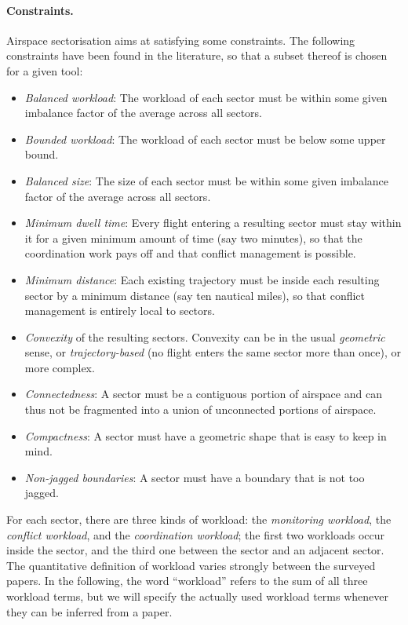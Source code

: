 \documentclass[a4paper,12pt]{article}
\begin{document}
\paragraph{Constraints.}
Airspace sectorisation aims at satisfying some constraints.  The
following constraints have been found in the literature, so that a
subset thereof is chosen for a given tool:
\begin{itemize}
\item \emph{Balanced workload}: The workload of each sector must be
  within some given imbalance factor of the average across all
  sectors.
\item \emph{Bounded workload}: The workload of each sector must be
  below some upper bound.
\item \emph{Balanced size}: The size of each sector must be within
  some given imbalance factor of the average across all sectors.
\item \emph{Minimum dwell time}: Every flight entering a resulting
  sector must stay within it for a given minimum amount of time (say
  two minutes), so that the coordination work pays off and that
  conflict management is possible.
\item \emph{Minimum distance}: Each existing trajectory must be inside
  each resulting sector by a minimum distance (say ten nautical
  miles), so that conflict management is entirely local to sectors.
\item \emph{Convexity} of the resulting sectors.  Convexity can be in
  the usual \emph{geometric} sense, or \emph{trajectory-based} (no
  flight enters the same sector more than once), or more complex.
\item \emph{Connectedness}: A sector must be a contiguous portion of
  airspace and can thus not be fragmented into a union of unconnected
  portions of airspace.
\item \emph{Compactness}: A sector must have a geometric shape that is
  easy to keep in mind.
\item \emph{Non-jagged boundaries}: A sector must have a boundary that
  is not too jagged.
\end{itemize}
For each sector, there are three kinds of workload: the
\emph{monitoring workload}, the \emph{conflict workload}, and the
\emph{coordination workload}; the first two workloads occur inside the
sector, and the third one between the sector and an adjacent sector.
The quantitative definition of workload varies strongly between the
surveyed papers.  In the following, the word ``workload'' refers to
the sum of all three workload terms, but we will specify the actually
used workload terms whenever they can be inferred from a paper.
\end{document}
